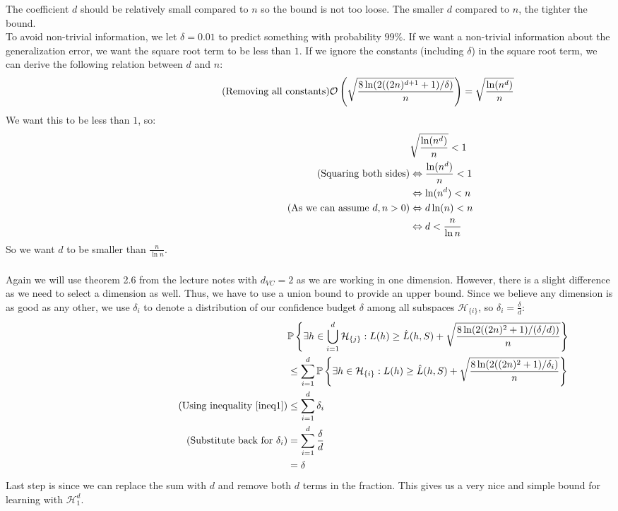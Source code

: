 \documentclass[a4paper]{article}
\newcommand{\comment}[1]{%
  \text{\phantom{(#1)}} \tag{#1}}
\begin{document}
\subsubsection{}
The coefficient $d$ should be relatively small compared to $n$ so the bound is not too loose. The smaller $d$ compared to $n$, the tighter the bound. \\
To avoid non-trivial information, we let $\delta=0.01$ to predict something with probability $99\%$. If we want a non-trivial information about the generalization error, we want the square root term to be less than $1$. If we ignore the constants (including $\delta$) in the square root term, we can derive the following relation between $d$ and $n$:
\begin{align*}
  \comment{Removing all constants} \mathcal{O}\left(\sqrt{\frac{8\ln(2((2n)^{d+1}+1)/\delta)}{n}}\right) &= \sqrt{\frac{\ln(n^d)}{n}}
\end{align*}
We want this to be less than $1$, so:
\begin{align*}
  &\sqrt{\frac{\ln(n^d)}{n}} < 1 \\
  \comment{Squaring both sides} &\Leftrightarrow \frac{\ln(n^d)}{n} < 1 \\
                                &\Leftrightarrow \ln(n^d) < n \\
  \comment{As we can assume $d,n > 0$} &\Leftrightarrow d\ln(n) < n \\
                                       &\Leftrightarrow d < \frac{n}{\ln n}
\end{align*}
So we want $d$ to be smaller than $\frac{n}{\ln n}$.

\subsubsection{}
Again we will use theorem 2.6 from the lecture notes with $d_{VC}=2$ as we are working in one dimension. However, there is a slight difference as we need to select a dimension as well. Thus, we have to use a union bound to provide an upper bound. Since we believe any dimension is as good as any other, we use $\delta_i$ to denote a distribution of our confidence budget $\delta$ among all subspaces $\mathcal{H}_{\{i\}}$, so $\delta_i=\frac{\delta}{d}$:
\begin{align*}
  &\mathbb{P}\left\{ \exists h \in \bigcup_{i=1}^d \mathcal{H}_{\{j\}} : L(h)\geq \hat{L}(h, S)+\sqrt{\frac{8\ln(2((2n)^{2}+1)/(\delta/d))}{n}}\right\} \\
   &\leq \sum_{i=1}^d \mathbb{P}\left\{ \exists h \in \mathcal{H}_{\{i\}} : L(h)\geq \hat{L}(h, S)+\sqrt{\frac{8\ln(2((2n)^{2}+1)/\delta_i)}{n}}\right\} \\
  \comment{Using inequality \ref{ineq1}} &\leq \sum_{i=1}^d \delta_i \\
  \comment{Substitute back for $\delta_i$} &=\sum_{i=1}^d \frac{\delta}{d} \\
                               &= \delta
\end{align*}
Last step is since we can replace the sum with $d$ and remove both $d$ terms in the fraction. This gives us a very nice and simple bound for learning with $\mathcal{H}_1^d$.
\end{document}
